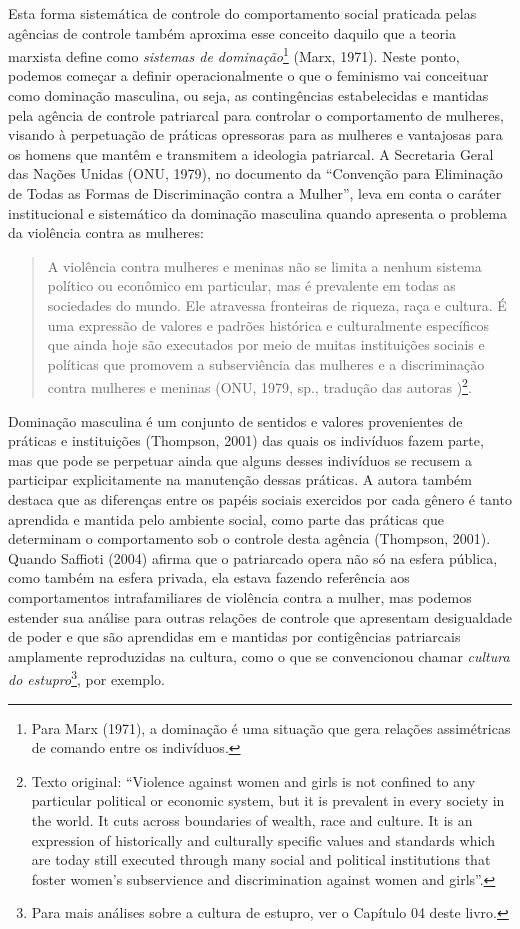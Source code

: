 Esta forma sistemática de controle do comportamento social praticada pelas agências de controle também aproxima esse conceito daquilo que a teoria marxista define como \textit{sistemas de dominação}\footnote{Para Marx (1971), a dominação é uma situação que gera relações assimétricas de comando entre os indivíduos.} (Marx, 1971). Neste ponto, podemos começar a definir operacionalmente o que o feminismo vai conceituar como dominação masculina, ou seja, as contingências estabelecidas e mantidas pela agência de controle patriarcal para controlar o comportamento de mulheres, visando à perpetuação de práticas opressoras para as mulheres e vantajosas para os homens que mantêm e transmitem a ideologia patriarcal. A Secretaria Geral das Nações Unidas (ONU, 1979), no documento da ``Convenção para Eliminação de Todas as Formas de Discriminação contra a Mulher'', leva em conta o caráter institucional e sistemático da dominação masculina quando apresenta o problema da violência contra as mulheres:

\begin{quote}
    A violência contra mulheres e meninas não se limita a nenhum sistema político ou econômico em particular, mas é prevalente em todas as sociedades do mundo. Ele atravessa fronteiras de riqueza, raça e cultura. É uma expressão de valores e padrões histórica e culturalmente específicos que ainda hoje são executados por meio de muitas instituições sociais e políticas que promovem a subserviência das mulheres e a discriminação contra mulheres e meninas (ONU, 1979, sp., tradução das autoras )\footnote{Texto original: ``Violence against women and girls is not confined to any particular political or economic system, but it is prevalent in every society in the world. It cuts across boundaries of wealth, race and culture. It is an expression of historically and culturally specific values and standards which are today still executed through many social and political institutions that foster women’s subservience and discrimination against women and girls''.}.
\end{quote}

Dominação masculina é um conjunto de sentidos e valores provenientes de práticas e instituições (Thompson, 2001) das quais os indivíduos fazem parte, mas que pode se perpetuar ainda que alguns desses indivíduos se recusem a participar explicitamente na manutenção dessas práticas. A autora também destaca que as diferenças entre os papéis sociais exercidos por cada gênero é tanto aprendida e mantida pelo ambiente social, como parte das práticas que determinam o comportamento sob o controle desta agência (Thompson, 2001). Quando Saffioti (2004) afirma que o patriarcado opera não só na esfera pública, como também na esfera privada, ela estava fazendo referência aos comportamentos intrafamiliares de violência contra a mulher, mas podemos estender sua análise para outras relações de controle que apresentam desigualdade de poder e que são aprendidas em e mantidas por contigências patriarcais amplamente reproduzidas na cultura, como o que se convencionou chamar \textit{cultura do estupro}\footnote{Para mais análises sobre a cultura de estupro, ver o Capítulo 04 deste livro.}, por exemplo.

